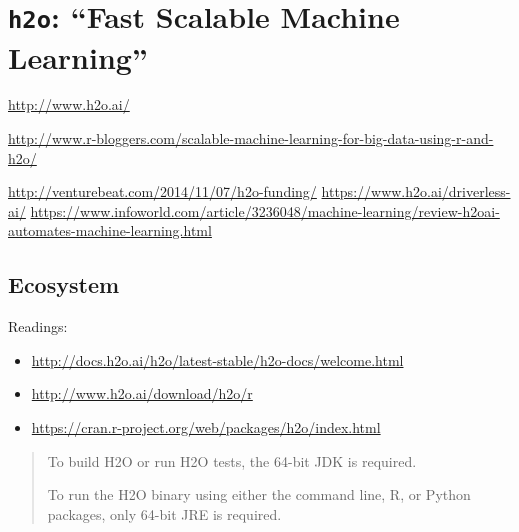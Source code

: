 \documentclass[]{book}
\newenvironment{Shaded}{\begin{snugshade}}{\end{snugshade}}
\newcommand{\KeywordTok}[1]{\textcolor[rgb]{0.13,0.29,0.53}{\textbf{#1}}}
\newcommand{\DataTypeTok}[1]{\textcolor[rgb]{0.13,0.29,0.53}{#1}}
\newcommand{\StringTok}[1]{\textcolor[rgb]{0.31,0.60,0.02}{#1}}
\newcommand{\OtherTok}[1]{\textcolor[rgb]{0.56,0.35,0.01}{#1}}
\newcommand{\ControlFlowTok}[1]{\textcolor[rgb]{0.13,0.29,0.53}{\textbf{#1}}}
\newcommand{\OperatorTok}[1]{\textcolor[rgb]{0.81,0.36,0.00}{\textbf{#1}}}
\newcommand{\NormalTok}[1]{#1}
\theoremstyle{definition}
\theoremstyle{definition}
\theoremstyle{definition}
\theoremstyle{remark}
\begin{document}
\section{\texorpdfstring{\texttt{h2o}: ``Fast Scalable Machine
Learning''}{h2o: Fast Scalable Machine Learning}}\label{h2o-fast-scalable-machine-learning}

\url{http://www.h2o.ai/}

\url{http://www.r-bloggers.com/scalable-machine-learning-for-big-data-using-r-and-h2o/}

\url{http://venturebeat.com/2014/11/07/h2o-funding/}
\url{https://www.h2o.ai/driverless-ai/}
\url{https://www.infoworld.com/article/3236048/machine-learning/review-h2oai-automates-machine-learning.html}

\subsection{Ecosystem}\label{ecosystem}

Readings:

\begin{itemize}
\item
  \url{http://docs.h2o.ai/h2o/latest-stable/h2o-docs/welcome.html}
\item
  \url{http://www.h2o.ai/download/h2o/r}
\item
  \url{https://cran.r-project.org/web/packages/h2o/index.html}
\end{itemize}

\begin{quote}
To build H2O or run H2O tests, the 64-bit JDK is required.

To run the H2O binary using either the command line, R, or Python
packages, only 64-bit JRE is required.
\end{quote}

\begin{Shaded}
\end{Shaded}
\end{document}
